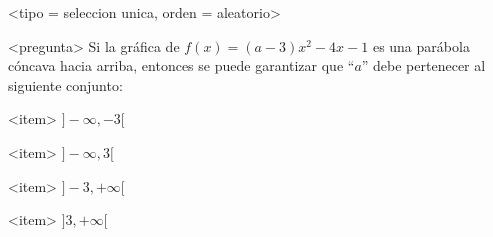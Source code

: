 <tipo = seleccion unica, orden = aleatorio>

<pregunta>
Si la gr\'afica de $f(x) = (a -3)x^2-4x -1$ es una par\'abola c\'oncava hacia arriba, entonces se puede garantizar que ``$a$'' debe pertenecer al siguiente conjunto:


<item>
$]{-}\infty, -3[$

<item>
$]{-}\infty, 3[$

<item>
$]-3, +\infty[$

<item>
$]3, +\infty[$



